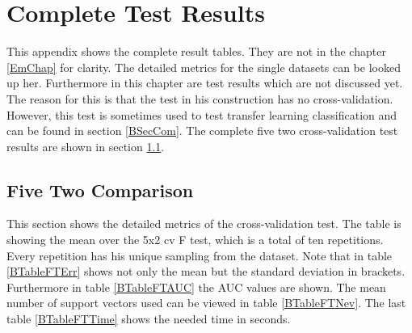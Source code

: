 \chapter{Complete Test Results}\label{appaB}
This appendix shows the complete result tables.
They are not in the chapter \ref{EmChap} for clarity.
The detailed metrics for the single datasets can be looked up her.
Furthermore in this chapter are test results which are not discussed yet. 
The reason for this is that the test in his construction has no cross-validation.
However, this test is sometimes used to test transfer learning classification \cite{Long.} and can be found in section \ref{BSecCom}.
The complete five two cross-validation test results are shown in section \ref{BSecFT}.

\section{Five Two Comparison}\label{BSecFT}
This section shows the detailed metrics of the cross-validation test.
The table is showing the mean over the 5x2 cv F test, which is a total of ten repetitions.
Every repetition has his unique sampling from the dataset. 
Note that in table \ref{BTableFTErr} shows not only the mean but the standard deviation in brackets.
Furthermore in table \ref{BTableFTAUC} the \acs{AUC} values are shown. 
The mean number of support vectors used can be viewed in table \ref{BTableFTNev}.
The last table \ref{BTableFTTime} shows the needed time in seconds. 
